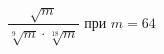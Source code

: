 \begin{ex}
	\begin{condition}
		\( \dfrac{\sqrt{m}}{\sqrt[9]{m}\cdot\sqrt[18]{m}} \) при \( m=64 \)
	\end{condition}
\end{ex}